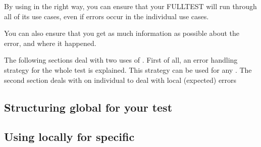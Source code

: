 By using \gdehandlers{} in the right way, you can ensure that your FULLTEST will run through all of its use cases, even if errors occur in the individual use cases. 

You can also ensure that you get as much information as possible about the error, and where it happened. 

The following sections deal with two uses of \gdehandlers{}. First of all, an error handling strategy for the whole test is explained. This strategy can be used for any \gdproject{}. The second section deals with \gdehandlers{} on individual \gdcases{} to deal with local (expected) errors

\subsection{Structuring global \gdehandlers{} for your test}



\subsection{Using \gdehandlers{} locally for specific \gdcases{}}
\label{BPEHLocal}


